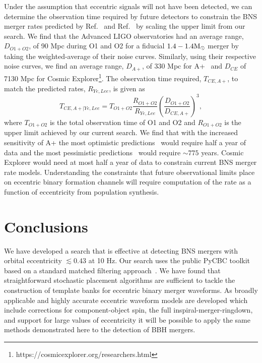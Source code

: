 Under the assumption that eccentric signals will not have been detected, we can determine the observation time required by future detectors to constrain the BNS merger rates predicted by Ref.~\cite{Lee:2009ca} and Ref.~\cite{Ye:2019xvf} by scaling the upper limit from our search. We find that the Advanced LIGO observatories had an average range, $D_{O1+O2}$, of 90 Mpc during O1 and O2 for a fiducial $1.4-1.4 \mathrm{M}_{\odot}$ merger by taking the weighted-average of their noise curves. Similarly, using their respective noise curves, we find an average range, $D_{A+}$, of 330 Mpc for A+~\cite{Aasi:2013wya} and $D_{CE}$ of 7130 Mpc for Cosmic Explorer\footnote{https://cosmicexplorer.org/researchers.html}. The observation time required, $T_{CE,A+}$, to match the predicted rates, $R_{Ye, Lee}$, is given as
\begin{equation}
    T_{CE,A+|Ye,Lee} = T_{O1+O2} \frac{R_{O1+O2}}{R_{Ye,Lee}} \left(\frac{D_{O1+O2}}{ D_{CE,A+}}\right)^3,
\end{equation}
where $T_{O1+O2}$ is the total observation time of O1 and O2 and $R_{O1+O2}$ is the upper limit achieved by our current search. We find that with the increased sensitivity of A+ the most optimistic predictions~\cite{Lee:2009ca} would require half a year of data and the most pessimistic predictions~\cite{Ye:2019xvf} would require $\sim 775$ years. Cosmic Explorer would need at most half a year of data to constrain current BNS merger rate models. Understanding the constraints that future observational limits place on eccentric binary formation channels will require computation of the rate as a function of eccentricity from population synthesis.

\section{Conclusions}

We have developed a search that is effective at detecting BNS mergers with orbital eccentricity $\lesssim0.43$ at 10 Hz. Our search uses the public PyCBC toolkit~\cite{pycbc-github} based on a standard matched filtering approach~\cite{Nitz:2018imz,Usman:2015kfa}. We have found that straightforward stochastic placement algorithms are sufficient to tackle the construction of template banks for eccentric binary merger waveforms. As broadly applicable and highly accurate eccentric waveform models are developed which include corrections for component-object spin, the full inspiral-merger-ringdown, and support for large values of eccentricity it will be possible to apply the same methods demonstrated here to the detection of BBH mergers.


